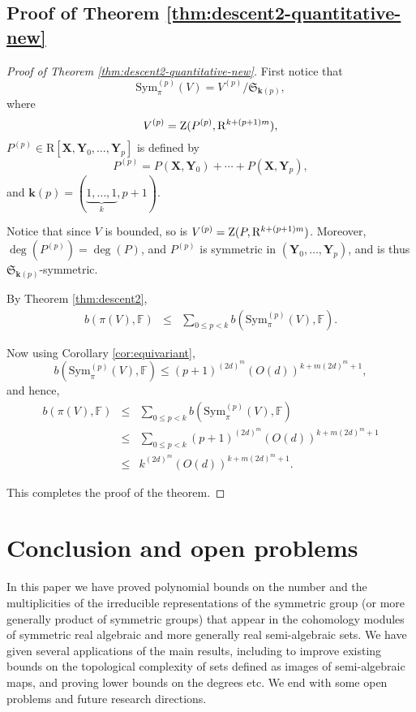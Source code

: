 \documentclass{amsart}
\theoremstyle{definition}
\theoremstyle{remark}
\numberwithin{equation}{section}
\begin{document}
\subsection{Proof of Theorem \ref{thm:descent2-quantitative-new}}
\begin{proof}[Proof of Theorem \ref{thm:descent2-quantitative-new}]
First notice that 
\[
{\mathrm{Sym}}^{(p)}_{\pi} (V) =  V^{(p)}/\mathfrak{S}_{{\mathbf{k}}(p)},
\]
where 
\[
V^{(p)} = {{\rm Z}}(P^{(p)},{\mathrm{R}}^{k+(p+1)m}),
\]
$P^{(p)} \in {\mathrm{R}}[{\mathbf{X}},{\mathbf{Y}}_0,\ldots,{\mathbf{Y}}_{p}]$ is defined by
\[
 P^{(p)} = P({\mathbf{X}},{\mathbf{Y}}_0)+ \cdots+ P({\mathbf{X}},{\mathbf{Y}}_{p}),
 \]
 and 
 ${\mathbf{k}}(p) = (\underbrace{1,\ldots,1}_{k},p+1)$.

  Notice that since $V$ is bounded, so is $V^{(p)}= {{\rm Z}}(P,{\mathrm{R}}^{k+(p+1)m})$.
 Moreover, 
 $\deg(P^{(p)}) = \deg(P)$, and $P^{(p)}$ is symmetric in $({\mathbf{Y}}_0,\ldots,{\mathbf{Y}}_{p})$, and is thus
 $\mathfrak{S}_{{\mathbf{k}}(p)}$-symmetric.
 
By Theorem \ref{thm:descent2},
\begin{eqnarray*}
    b (\pi (V) ,{\mathbb{F}}) & \leq & \sum_{0 \leq p<k} b ({\mathrm{Sym}}^{(p)}_{\pi} (V) ,{\mathbb{F}}).
\end{eqnarray*}

Now using Corollary  \ref{cor:equivariant},
\[
b ({\mathrm{Sym}}^{(p)}_{\pi} (V) ,{\mathbb{F}}) \leq (p+1)^{(2d)^{m}} (O(d))^{k+m (2d)^m + 1},
\]
and hence,
\begin{eqnarray*}
  b (\pi (V) ,{\mathbb{F}}) & \leq & \sum_{0 \leq p<k} b ({\mathrm{Sym}}^{(p)}_{\pi} (V) ,{\mathbb{F}})\\
  &\leq & \sum_{0 \leq p<k} (p+1)^{(2d)^{m}} (O(d))^{k+ m (2d)^m +1} \\
  &\leq & k^{(2d)^{m}} (O(d))^{k+m (2d)^m +1}.
\end{eqnarray*}
 
This completes the proof of the theorem.
\end{proof}

 

\section{Conclusion and open problems}
\label{sec:conclusion}

In this paper we have proved polynomial bounds on the number and the multiplicities of the
irreducible representations of the symmetric group (or more generally product of symmetric groups) that appear in the cohomology modules of symmetric real algebraic and more generally real semi-algebraic sets. We have given several applications of the main results, including to improve existing
bounds on the topological complexity of sets defined as images of semi-algebraic maps, 
and proving lower bounds on the degrees etc. We end with some open problems and future research
directions.
 
\end{document}

